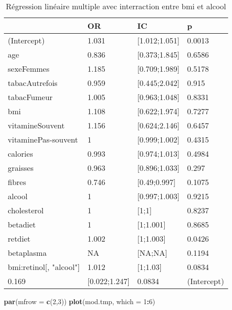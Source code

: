 \documentclass[]{article}
\newenvironment{Shaded}{\begin{snugshade}}{\end{snugshade}}
\newcommand{\KeywordTok}[1]{\textcolor[rgb]{0.13,0.29,0.53}{\textbf{#1}}}
\newcommand{\DataTypeTok}[1]{\textcolor[rgb]{0.13,0.29,0.53}{#1}}
\newcommand{\DecValTok}[1]{\textcolor[rgb]{0.00,0.00,0.81}{#1}}
\newcommand{\OperatorTok}[1]{\textcolor[rgb]{0.81,0.36,0.00}{\textbf{#1}}}
\newcommand{\NormalTok}[1]{#1}
\begin{document}
\begin{table}

\caption{\label{tab:unnamed-chunk-86}Régression linéaire multiple avec interraction entre bmi et alcool}
\centering
\begin{tabular}[t]{l|l|l|l}
\hline
  & OR & IC & p\\
\hline
\rowcolor[HTML]{BBD2E1}  (Intercept) & 1.031 & [1.012;1.051] & 0.0013\\
\hline
age & 0.836 & [0.373;1.845] & 0.6586\\
\hline
\rowcolor[HTML]{BBD2E1}  sexeFemmes & 1.185 & [0.709;1.989] & 0.5178\\
\hline
tabacAutrefois & 0.959 & [0.445;2.042] & 0.915\\
\hline
\rowcolor[HTML]{BBD2E1}  tabacFumeur & 1.005 & [0.963;1.048] & 0.8331\\
\hline
bmi & 1.108 & [0.622;1.974] & 0.7277\\
\hline
\rowcolor[HTML]{BBD2E1}  vitamineSouvent & 1.156 & [0.624;2.146] & 0.6457\\
\hline
vitaminePas-souvent & 1 & [0.999;1.002] & 0.4315\\
\hline
\rowcolor[HTML]{BBD2E1}  calories & 0.993 & [0.974;1.013] & 0.4984\\
\hline
graisses & 0.963 & [0.896;1.033] & 0.297\\
\hline
\rowcolor[HTML]{BBD2E1}  fibres & 0.746 & [0.49;0.997] & 0.1075\\
\hline
alcool & 1 & [0.997;1.003] & 0.9215\\
\hline
\rowcolor[HTML]{BBD2E1}  cholesterol & 1 & [1;1] & 0.8237\\
\hline
betadiet & 1 & [1;1.001] & 0.8685\\
\hline
\rowcolor[HTML]{BBD2E1}  retdiet & 1.002 & [1;1.003] & 0.0426\\
\hline
betaplasma & NA & [NA;NA] & 0.1194\\
\hline
\rowcolor[HTML]{BBD2E1}  bmi:retinol[, "alcool"] & 1.012 & [1;1.03] & 0.0834\\
\hline
0.169 & [0.022;1.247] & 0.0834 & (Intercept)\\
\hline
\end{tabular}
\end{table}

\begin{Shaded}
\begin{Highlighting}[]
\KeywordTok{par}\NormalTok{(}\DataTypeTok{mfrow =} \KeywordTok{c}\NormalTok{(}\DecValTok{2}\NormalTok{,}\DecValTok{3}\NormalTok{))}
\KeywordTok{plot}\NormalTok{(mod.tmp, }\DataTypeTok{which =} \DecValTok{1}\OperatorTok{:}\DecValTok{6}\NormalTok{)}
\end{Highlighting}
\end{Shaded}
\end{document}
